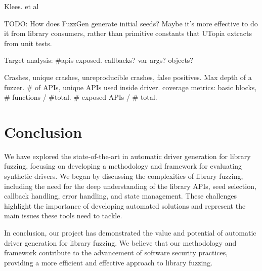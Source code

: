 \documentclass[a4paper,11pt,oneside]{report}
\begin{document}
Klees. et al

TODO:
How does FuzzGen generate initial seeds? Maybe it's more effective to do it from
library consumers, rather than primitive constants that UTopia extracts from unit
tests.


Target analysis: \#apis exposed. callbacks? var args? objects?


Crashes, unique crashes, unreproducible crashes, false positives. 
Max depth of a fuzzer. \# of APIs, unique APIs used inside driver.
coverage metrics: basic blocks, \# functions / \#total. 
\# exposed APIs / \# total.







\chapter{Conclusion}

We have explored the state-of-the-art in automatic driver generation
for library fuzzing, focusing on developing a methodology and framework
for evaluating synthetic drivers. We began by discussing the complexities 
of library fuzzing, including the need for the deep understanding of the 
library APIs, seed selection, callback handling, error handling, and 
state management. These challenges highlight the importance of 
developing automated solutions and represent the main issues these tools 
need to tackle. 

In conclusion, our project has demonstrated the value and potential 
of automatic driver generation for library fuzzing. We believe that 
our methodology and framework contribute to the advancement of 
software security practices, providing a more efficient and effective 
approach to library fuzzing.

\cleardoublepage
{}
{}
\printbibliography

%
%
\end{document}
